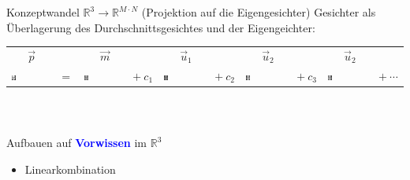 \documentclass[10pt,aspectratio=169]{beamer}
\begin{document}
\begin{frame}[fragile]{Konzeptwandel $\mathbb R^3\longrightarrow\mathbb R^{M\cdot N}$ (Projektion auf die Eigengesichter)}
	Gesichter als Überlagerung des Durchschnittsgesichtes und der Eigengeichter:\\[0.5cm]
	\begin{tabular}{m{1.3cm} c m{1.3cm} c m{1.3cm} c m{1.3cm} c m{1.3cm} c}
		$\quad\ \ \vec p$ & & $\quad\ \ \vec m$ & & $\quad\ \ \vec u_1$ & & $\quad\ \ \vec u_2$ & & $\quad\ \ \vec u_2$ & \\
		\includegraphics[width=0.1\textwidth]{images/eigenfaces/mona_lisa_eigen_approx} &
		$=$ & \includegraphics[width=0.1\textwidth]{images/facespace/meanface} & $+\ c_1$ & \includegraphics[width=0.1\textwidth]{images/eigenfaces/eigenface00}
		& $+\ c_2$ & \includegraphics[width=0.1\textwidth]{images/eigenfaces/eigenface01} & $+\ c_3$ & \includegraphics[width=0.1\textwidth]{images/eigenfaces/eigenface02} & $+\ \cdots$
	\end{tabular}\\[0.5cm]
	\pause
	\begin{minipage}{0.45\textwidth}
		\begin{columns}[T,onlytextwidth]
			\column{\textwidth}
			\begin{block}{Aufbauen auf \textcolor{blue}{\textbf{Vorwissen}} im $\mathbb R^3$}
				\begin{itemize}
					\item Linearkombination

\end{itemize}
\end{block}
\end{columns}
\end{minipage}
\end{frame}
\end{document}
